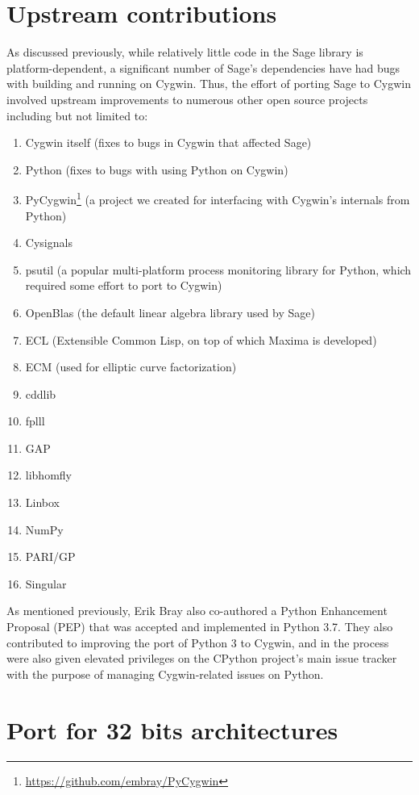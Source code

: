 \section{Upstream contributions}\label{upstream-contributions}

As discussed previously, while relatively little code in the Sage library is
platform-dependent, a significant number of Sage's dependencies have had bugs
with building and running on Cygwin.  Thus, the effort of porting Sage to
Cygwin involved upstream improvements to numerous other open source projects
including but not limited to:

\begin{enumerate}
\item Cygwin itself (fixes to bugs in Cygwin that affected Sage)
\item Python (fixes to bugs with using Python on Cygwin)
\item PyCygwin\footnote{\url{https://github.com/embray/PyCygwin}} (a project we created for interfacing with Cygwin's internals from Python)
\item Cysignals
\item psutil (a popular multi-platform process monitoring library for Python, which required some effort to port to Cygwin)
\item OpenBlas (the default linear algebra library used by Sage)
\item ECL (Extensible Common Lisp, on top of which Maxima is developed)
\item ECM (used for elliptic curve factorization)
\item cddlib
\item fplll
\item GAP
\item libhomfly
\item Linbox
\item NumPy
\item PARI/GP
\item Singular
\end{enumerate}

As mentioned previously, Erik Bray also co-authored a Python Enhancement
Proposal (PEP) that was accepted and implemented in Python 3.7.  They also
contributed to improving the port of Python 3 to Cygwin, and in the process
were also given elevated privileges on the CPython project's main issue tracker
with the purpose of managing Cygwin-related issues on Python.


\section{Port for 32 bits architectures}\label{port-for-32-bits-architectures}

